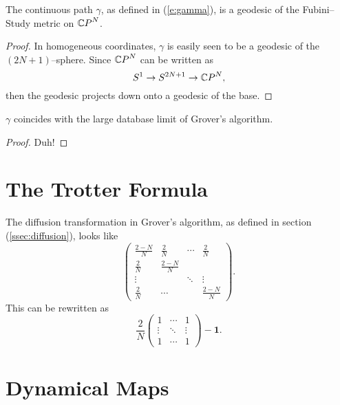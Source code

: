 \begin{prop}
The continuous path $\gamma$, as defined in (\ref{e:gamma}),
is a geodesic of the Fubini--Study metric on ${\mathbb{C} P}^N$.
\end{prop}

\begin{proof}
In homogeneous coordinates, $\gamma$ is easily seen to be
a geodesic of the $(2N+1)$--sphere.
Since ${\mathbb{C} P}^N$ can be written as 
\begin{equation}
S^1\to S^{2N+1}\to {\mathbb{C} P}^N,
\end{equation}
then the geodesic projects down onto a geodesic of the base.
\end{proof}

\begin{prop}
$\gamma$ coincides with the large database
limit of Grover's algorithm.
\end{prop}

\begin{proof}
Duh!
\end{proof}

\section{The Trotter Formula}

The diffusion transformation in Grover's algorithm,
as defined in section (\ref{ssec:diffusion}), looks like
\begin{equation}
\begin{pmatrix}
    \frac{2-N}{N} & \frac{2}{N} & \cdots & \frac{2}{N} \\
    \frac{2}{N}   & \frac{2-N}{N} & &  \\
    \vdots &  & \ddots & \vdots \\
    \frac{2}{N}   & \cdots && \frac{2-N}{N} 
\end{pmatrix}.
\end{equation}
This can be rewritten as
\begin{equation}
\frac{2}{N}
\begin{pmatrix}
    1 & \cdots & 1 \\
    \vdots & \ddots & \vdots \\
    1 & \cdots & 1
\end{pmatrix}
- \textbf{1}.
\end{equation}

\section{Dynamical Maps}

